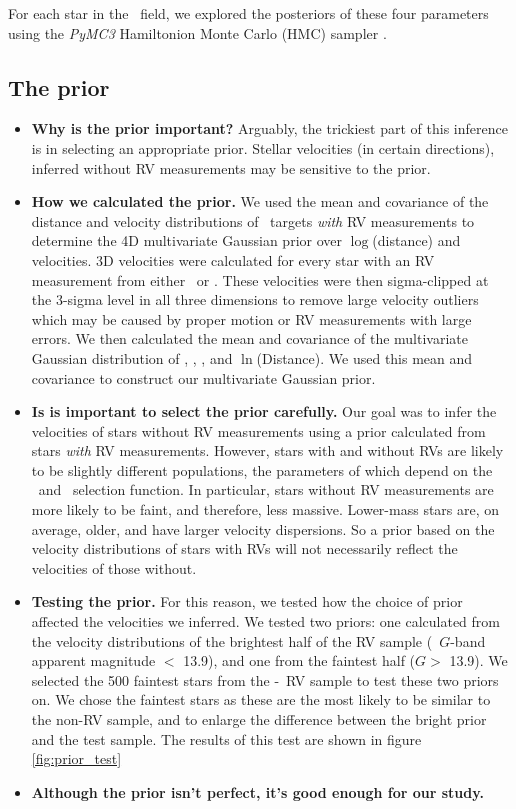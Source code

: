 For each star in the \kepler\ field, we explored the posteriors of these four
parameters using the {\it PyMC3} Hamiltonion Monte Carlo (HMC) sampler
.

\subsection{The prior}
\label{sec:prior}

\begin{itemize}
    \item{{\bf Why is the prior important?}
Arguably, the trickiest part of this inference is in selecting an appropriate
        prior.
Stellar velocities (in certain directions), inferred without RV measurements
        may be sensitive to the prior.
        }
    \item{{\bf How we calculated the prior.}
We used the mean and covariance of the distance and velocity distributions of
\kepler\ targets {\it with} RV measurements to determine the 4D multivariate
Gaussian prior over $\log$(distance) and velocities.
3D velocities were calculated for every star with an RV measurement from
either \gaia\ or \lamost.
These velocities were then sigma-clipped at the 3-sigma level in all three
dimensions to remove large velocity outliers which may be caused by proper
motion or RV measurements with large errors.
We then calculated the mean and covariance of the multivariate Gaussian
distribution of \vx, \vy, \vz, and $\ln$(Distance).
We used this mean and covariance to construct our multivariate Gaussian prior.
        }
    \item{{\bf Is is important to select the prior carefully.}
Our goal was to infer the velocities of stars without RV measurements using a
prior calculated from stars {\it with} RV measurements.
However, stars with and without RVs are likely to be slightly different
populations, the parameters of which depend on the \gaia\ and \lamost\
selection function.
In particular, stars without RV measurements are more likely to be faint, and
therefore, less massive.
Lower-mass stars are, on average, older, and have larger velocity dispersions.
So a prior based on the velocity distributions of stars with RVs will not
necessarily reflect the velocities of those without.
        }
    \item{{\bf Testing the prior.}
For this reason, we tested how the choice of prior affected the velocities we
inferred.
We tested two priors: one calculated from the velocity distributions of the
brightest half of the RV sample (\gaia\ $G$-band apparent magnitude $<$ 13.9),
and one from the faintest half ($G > $ 13.9).
We selected the 500 faintest stars from the \gaia-\lamost\ RV sample to test
these two priors on.
We chose the faintest stars as these are the most likely to be similar to the
non-RV sample, and to enlarge the difference between the bright prior and the
test sample.
The results of this test are shown in figure \ref{fig:prior_test}
        }
    \item{{\bf Although the prior isn't perfect, it's good
        enough for our study.}}
\end{itemize}


